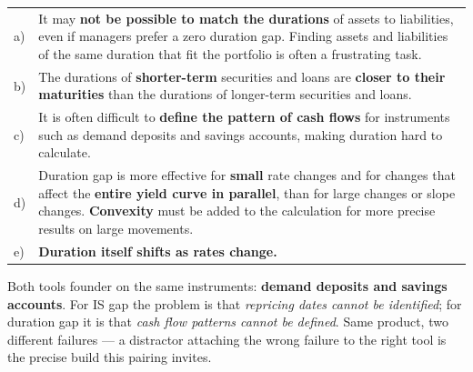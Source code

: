 \begin{center}
\small
\begin{tabularx}{\textwidth}{@{}p{0.5cm} X@{}}
\toprule
\rowcolor{PaleGold}\multicolumn{2}{@{}l}{\textbf{Limitations of duration gap management}} \\
\midrule
a) & It may \textbf{not be possible to match the durations} of assets to liabilities, even if managers prefer a zero duration gap. Finding assets and liabilities of the same duration that fit the portfolio is often a frustrating task. \\
b) & The durations of \textbf{shorter-term} securities and loans are \textbf{closer to their maturities} than the durations of longer-term securities and loans. \\
c) & It is often difficult to \textbf{define the pattern of cash flows} for instruments such as demand deposits and savings accounts, making duration hard to calculate. \\
d) & Duration gap is more effective for \textbf{small} rate changes and for changes that affect the \textbf{entire yield curve in parallel}, than for large changes or slope changes. \textbf{Convexity} must be added to the calculation for more precise results on large movements. \\
e) & \textbf{Duration itself shifts as rates change.} \\
\bottomrule
\end{tabularx}
\end{center}

\begin{lrtrapbox}
Both tools founder on the same instruments: \textbf{demand deposits and savings accounts}. For IS gap the problem is that \emph{repricing dates cannot be identified}; for duration gap it is that \emph{cash flow patterns cannot be defined}. Same product, two different failures --- a distractor attaching the wrong failure to the right tool is the precise build this pairing invites.
\end{lrtrapbox}


